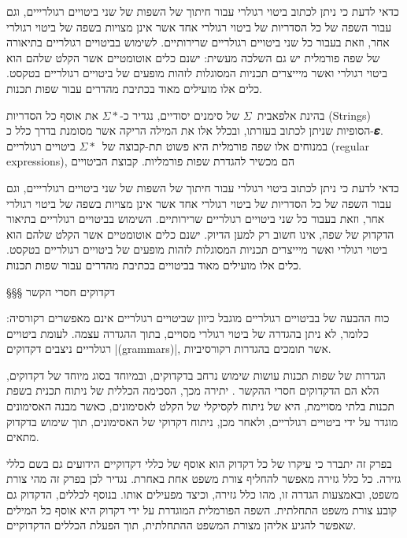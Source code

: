 כדאי לדעת כי ניתן לכתוב ביטוי רגולרי עבור חיתוך של השפות של שני ביטויים
רגולרייים, וגם עבור השפה של כל הסדריות של ביטוי רגולרי אחד אשר אינן מצויות בשפה
של ביטוי רגולרי אחר, וזאת בעבור כל שני ביטויים רגולריים שרירותיים. לשימוש
בביטויים רגולריים בתיאורה של שפה פורמלית יש גם השלכה מעשית: ישנם כלים אוטומטיים
אשר הקלט שלהם הוא ביטוי רגולרי ואשר מיייצרים תכניות המסוגלות לזהות
מופעים של ביטויים רגולריים בטקסט. כלים אלו מועילים מאוד בכתיבת מהדרים עבור שפות
תכנות.

\begin{editing}
  בהינת אלפאבית~$Σ$ של סימנים יסודיים, נגדיר כ-$Σ*$ את אוסף כל
  הסדריות (Strings) הסופיות שניתן לכתוב בעזרתו, ובכלל אלו את המילה הריקה אשר
  מסומנת בדרך כלל כ-𝜺. במנוחים אלו שפה פורמלית היא פשוט תת-קבוצה של~$Σ*$ ביטויים
  רגולריים (regular expressions), הם מכשיר להגדרת שפות פורמליות. קבוצת הביטויים

  כדאי לדעת כי ניתן לכתוב ביטוי רגולרי עבור חיתוך של השפות של שני ביטויים
  רגולרייים, וגם עבור השפה של כל הסדריות של ביטוי רגולרי אחד אשר אינן מצויות בשפה
  של ביטוי רגולרי אחר, וזאת בעבור כל שני ביטויים רגולריים שרירותיים. השימוש
  בביטויים רגולריים בתיאור הדקדוק של שפה, אינו חשוב רק למען הדיוק. ישנם כלים
  אוטומטיים אשר הקלט שלהם הוא ביטוי רגולרי ואשר מיייצרים תכניות המסוגלות לזהות
  מופעים של ביטויים רגולריים בטקסט. כלים אלו מועילים מאוד בביטויים בכתיבת מהדרים
  עבור שפות תכנות.

\end{editing}

§§§ דקדוקים חסרי הקשר

כוח ההבעה של בביטויים רגולריים מוגבל כיוון שביטויים רגולריים אינם מאפשרים
רקורסיה: כלומר, לא ניתן בהגדרה של ביטוי רגולרי מסויים, בתוך ההגדרה עצמה. לעומת
ביטויים רגולריים ניצבים דקדוקים \E|(grammars)|, אשר תומכים בהגדרות רקורסיביות.

הגדרות של שפות תכנות עושות שימוש נרחב בדקדוקים, ובמיוחד בסוג מיוחד של דקדוקים,
הלא הם הדקדוקים חסרי ההקשר . יתירה מכך, הסכימה
הכללית של ניתוח תכנית בשפת תכנות בלתי מסויימת, היא של ניתוח לקסיקלי של הקלט
לאסימונים, כאשר מבנה האסימונים מוגדר על ידי ביטויים רגולריים, ולאחר מכן, ניתוח
דקדוקי של האסימונים, תוך שימוש בדקדוק מתאים.

בפרק זה יתברר כי עיקרו של כל דקדוק הוא אוסף של כללי דקדוקיים הידועים גם בשם
כללי גזירה. כל כלל גזירה מאפשר להחליף צורת משפט אחת באחרת. נגדיר לכן בפרק זה
מהי צורת משפט, ובאמצעות הגדרה זו, מהו כלל גזירה, וכיצד מפעילים אותו. בנוסף
לכללים, הדקדוק גם קובע צורת משפט התחלתית. השפה הפורמלית המוגדרת על ידי דקדוק
היא אוסף כל המילים שאפשר להגיע אליהן מצורת המשפט ההתחלתית, תוך הפעלת הכללים
הדקדוקיים.

